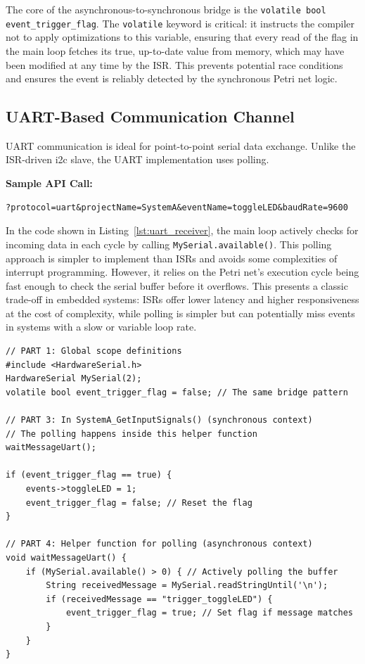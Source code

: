 The core of the asynchronous-to-synchronous bridge is the \texttt{volatile bool event\_trigger\_flag}. The \texttt{volatile} keyword is critical: it instructs the compiler not to apply optimizations to this variable, ensuring that every read of the flag in the main loop fetches its true, up-to-date value from memory, which may have been modified at any time by the ISR. This prevents potential race conditions and ensures the event is reliably detected by the synchronous Petri net logic.

\subsection{UART-Based Communication Channel}
UART communication is ideal for point-to-point serial data exchange. Unlike the ISR-driven \gls{i2c} slave, the UART implementation uses polling.

\noindent\textbf{Sample API Call:}
\begin{verbatim}
?protocol=uart&projectName=SystemA&eventName=toggleLED&baudRate=9600
\end{verbatim}

In the code shown in Listing~\ref{lst:uart_receiver}, the main loop actively checks for incoming data in each cycle by calling \texttt{MySerial.available()}. This polling approach is simpler to implement than ISRs and avoids some complexities of interrupt programming. However, it relies on the Petri net's execution cycle being fast enough to check the serial buffer before it overflows. This presents a classic trade-off in embedded systems: ISRs offer lower latency and higher responsiveness at the cost of complexity, while polling is simpler but can potentially miss events in systems with a slow or variable loop rate.

\begin{verbatim}
// PART 1: Global scope definitions
#include <HardwareSerial.h>
HardwareSerial MySerial(2);
volatile bool event_trigger_flag = false; // The same bridge pattern

// PART 3: In SystemA_GetInputSignals() (synchronous context)
// The polling happens inside this helper function
waitMessageUart(); 

if (event_trigger_flag == true) {
    events->toggleLED = 1;
    event_trigger_flag = false; // Reset the flag
}

// PART 4: Helper function for polling (asynchronous context)
void waitMessageUart() {
    if (MySerial.available() > 0) { // Actively polling the buffer
        String receivedMessage = MySerial.readStringUntil('\n');
        if (receivedMessage == "trigger_toggleLED") {
            event_trigger_flag = true; // Set flag if message matches
        }
    }
}
\end{verbatim}

